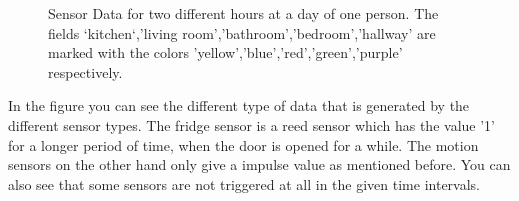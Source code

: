 \begin{figure}[h!]
\begin{minipage}[b]{0.45\textwidth}
   \end{minipage}
   \caption{Sensor Data for two different hours at a day of one person. The fields `kitchen`,'living room','bathroom','bedroom','hallway' are marked with the colors 'yellow','blue','red','green','purple' respectively.}
   \label{fig:PlaineSensorData}
 \end{figure}

In the figure you can see the different type of data that is generated by the different sensor types. The fridge sensor is a reed sensor which has the value '1' for a longer period of time, when the door is opened for a while. The motion sensors on the other hand only give a impulse value as mentioned before. You can also see that some sensors are not triggered at all in the given time intervals.

